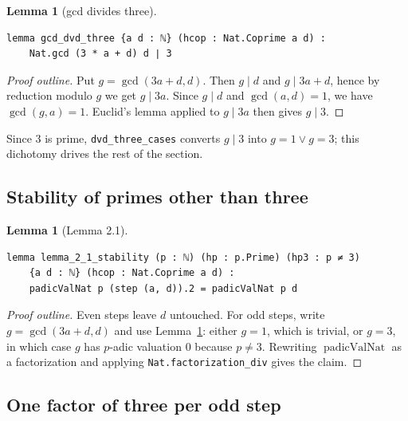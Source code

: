 \documentclass[11pt,a4paper]{article}
\newtheorem{lemma}[theorem]{Lemma}
\begin{document}
\begin{lemma}[gcd divides three]
\label{thm:gcd3}
\leavevmode\par\vspace{0.3em}
\begin{lstlisting}
lemma gcd_dvd_three {a d : ℕ} (hcop : Nat.Coprime a d) :
    Nat.gcd (3 * a + d) d ∣ 3
\end{lstlisting}
\end{lemma}

\begin{proof}[Proof outline]
Put $g=\gcd(3a+d,d)$.  Then $g\mid d$ and $g\mid 3a+d$, hence by reduction modulo
$g$ we get $g\mid 3a$.  Since $g\mid d$ and $\gcd(a,d)=1$, we have $\gcd(g,a)=1$.
Euclid's lemma applied to $g\mid 3a$ then gives $g\mid 3$.
\end{proof}

Since $3$ is prime, \texttt{dvd\_three\_cases} converts $g\mid 3$ into
$g=1\vee g=3$; this dichotomy drives the rest of the section.

\subsection{Stability of primes other than three}

\begin{lemma}[Lemma 2.1]
\label{thm:stab}
\leavevmode\par\vspace{0.3em}
\begin{lstlisting}
lemma lemma_2_1_stability (p : ℕ) (hp : p.Prime) (hp3 : p ≠ 3)
    {a d : ℕ} (hcop : Nat.Coprime a d) :
    padicValNat p (step (a, d)).2 = padicValNat p d
\end{lstlisting}
\end{lemma}

\begin{proof}[Proof outline]
Even steps leave $d$ untouched.  For odd steps, write $g=\gcd(3a+d,d)$ and use
Lemma~\ref{thm:gcd3}: either $g=1$, which is trivial, or $g=3$, in which case
$g$ has $p$-adic valuation $0$ because $p\neq 3$.  Rewriting
$\operatorname{padicValNat}$ as a factorization and applying
\texttt{Nat.factorization\_div} gives the claim.
\end{proof}

\subsection{One factor of three per odd step}
\end{document}
